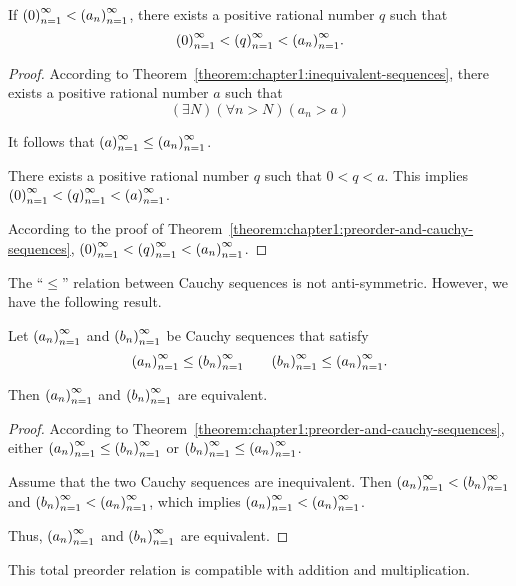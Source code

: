 \begin{theorem}\label{theorem:chapter1:rational-number-between-zero-and-positive-cauchy-sequence}
    If $\seq{0} < \seq{a_{n}}$, there exists a positive rational number $q$ such that
    \[
        \seq{0} < \seq{q} < \seq{a_{n}}.
    \]
\end{theorem}

\begin{proof}
    According to Theorem~\ref{theorem:chapter1:inequivalent-sequences}, there exists a positive rational number $a$ such that
    \[
        (\exists N)(\forall n > N)(a_{n} > a)
    \]

    It follows that $\seq{a} \le \seq{a_{n}}$.

    There exists a positive rational number $q$ such that $0 < q < a$. This implies $\seq{0} < \seq{q} < \seq{a}$.

    According to the proof of Theorem~\ref{theorem:chapter1:preorder-and-cauchy-sequences}, $\seq{0} < \seq{q} < \seq{a_{n}}$.
\end{proof}

The ``$\le$'' relation between Cauchy sequences is not anti-symmetric. However, we have the following result.

\begin{theorem}\label{theorem:chapter1:weak-anti-symmetry}
    Let $\seq{a_{n}}$ and $\seq{b_{n}}$ be Cauchy sequences that satisfy
    \[
        \seq{a_{n}}\le\seq{b_{n}}\qquad\seq{b_{n}}\le\seq{a_{n}}.
    \]

    Then $\seq{a_{n}}$ and $\seq{b_{n}}$ are equivalent.
\end{theorem}

\begin{proof}
    According to Theorem~\ref{theorem:chapter1:preorder-and-cauchy-sequences}, either $\seq{a_{n}}\le\seq{b_{n}}$ or $\seq{b_{n}}\le\seq{a_{n}}$.

    Assume that the two Cauchy sequences are inequivalent. Then $\seq{a_{n}} < \seq{b_{n}}$ and $\seq{b_{n}} < \seq{a_{n}}$, which implies $\seq{a_{n}} < \seq{a_{n}}$.

    Thus, $\seq{a_{n}}$ and $\seq{b_{n}}$ are equivalent.
\end{proof}

This total preorder relation is compatible with addition and multiplication.

